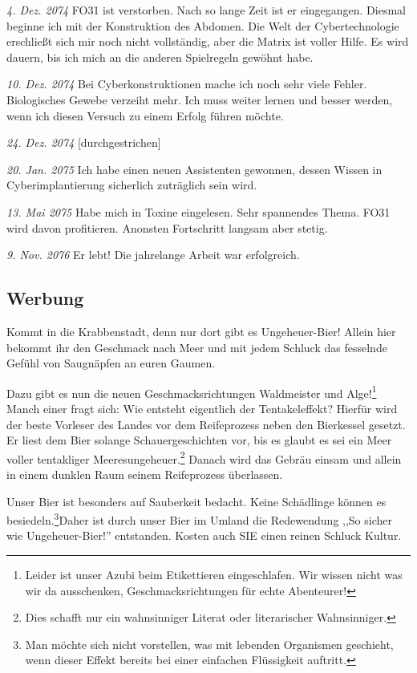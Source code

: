 \documentclass[final]{multiversum}
\begin{document}
\noindent\textit{4. Dez. 2074} FO31 ist verstorben. Nach so lange Zeit ist er eingegangen. Diesmal beginne ich mit der Konstruktion des Abdomen. Die Welt der Cybertechnologie erschließt sich mir noch nicht vollständig, aber die Matrix ist voller Hilfe. Es wird dauern, bis ich mich an die anderen Spielregeln gewöhnt habe.

\noindent\textit{10. Dez. 2074} Bei Cyberkonstruktionen mache ich noch sehr viele Fehler. Biologisches Gewebe verzeiht mehr. Ich muss weiter lernen und besser werden, wenn ich diesen Versuch zu einem Erfolg führen möchte.

\noindent\textit{24. Dez. 2074} [durchgestrichen]

\noindent\textit{20. Jan. 2075} Ich habe einen neuen Assistenten gewonnen, dessen Wissen in Cyberimplantierung sicherlich zuträglich sein wird.

\noindent\textit{13. Mai 2075} Habe mich in Toxine eingelesen. Sehr spannendes Thema. FO31 wird davon profitieren. Anonsten Fortschritt langsam aber stetig. 

\noindent\textit{9. Nov. 2076} Er lebt! Die jahrelange Arbeit war erfolgreich.

\subsection{Werbung}
Kommt in die Krabbenstadt, denn nur dort  gibt es Ungeheuer-Bier!
Allein hier bekommt ihr den Geschmack nach Meer und mit jedem Schluck das fesselnde Gefühl von Saugnäpfen an euren Gaumen.

Dazu gibt es nun die neuen Geschmacksrichtungen Waldmeister und Alge!\footnote{Leider ist unser Azubi beim Etikettieren eingeschlafen. Wir wissen nicht was wir da ausschenken, Geschmacksrichtungen für echte Abenteurer!}
Manch einer fragt sich: Wie entsteht eigentlich der Tentakeleffekt?
Hierfür wird der beste Vorleser des Landes vor dem Reifeprozess neben den Bierkessel gesetzt.
Er liest dem Bier solange Schauergeschichten vor, bis es glaubt es sei ein Meer voller tentakliger Meeresungeheuer.\footnote{Dies schafft nur ein wahnsinniger Literat oder literarischer Wahnsinniger.}
Danach wird das Gebräu einsam und allein in einem dunklen Raum seinem Reifeprozess überlassen.

Unser Bier ist besonders auf Sauberkeit bedacht. Keine Schädlinge können es besiedeln.\footnote{Man möchte sich nicht vorstellen, was mit lebenden Organismen geschieht, wenn dieser Effekt bereits bei einer einfachen Flüssigkeit auftritt.}Daher ist durch unser Bier im Umland die Redewendung ,,So sicher wie Ungeheuer-Bier!'' entstanden. Kosten auch SIE einen reinen Schluck Kultur.
\end{document}
